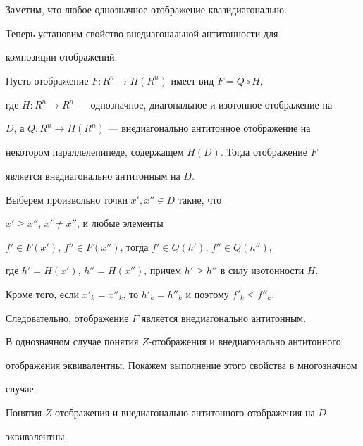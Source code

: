 Заметим, что любое однозначное отображение квазидиагонально.


Теперь установим свойство внедиагональной антитонности для 


композиции отображений.








\begin{props}\label{pr:2}


Пусть отображение $F:R^n \to \Pi(R^n)$ имеет вид $F=Q \circ H$,


где $H:R^n \to R^n$ --- однозначное, диагональное и изотонное отображение на


$D$, а  $Q:R^n \to \Pi(R^n)$ --- внедиагонально антитонное отображение на


некотором параллелепипеде, содержащем $H(D)$. Тогда отображение $F$


является внедиагонально антитонным на $D$.


\end{props}








\begin{pf}


Выберем произвольно точки $x', x'' \in D$ такие, что


$x'\ge x''$, $x'\neq x''$, и любые элементы


$f' \in F(x')$, $f'' \in F(x'')$, тогда $f' \in Q(h')$, $f'' \in Q(h'')$,


где $h'=H(x')$, $h''=H(x'')$, причем $h' \ge h''$ в силу изотонности $H$.


Кроме того, если  $x'_k = x''_k$, то $h'_k = h''_k$ и поэтому $f'_k \le f''_k$.


Следовательно, отображение $F$ является внедиагонально антитонным.


\end{pf}





В однозначном случае понятия $Z$-отображения и внедиагонально антитонного


отображения эквивалентны. Покажем выполнение этого свойства в многозначном


случае.








\begin{props}\label{pr:3}


Понятия $Z$-отображения и внедиагонально антитонного отображения на $D$


эквивалентны.


\end{props}








